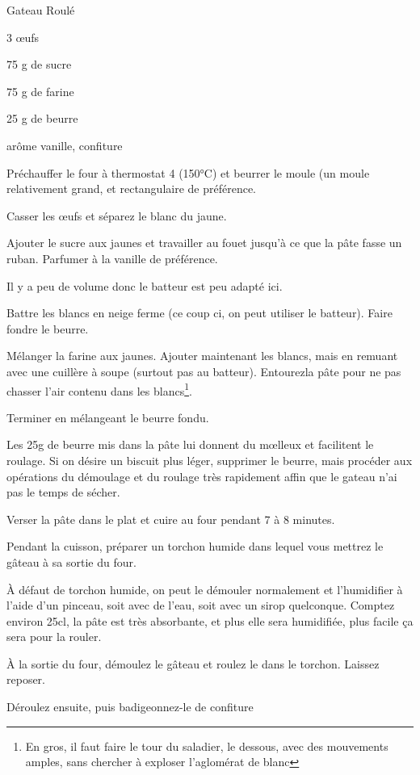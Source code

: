 \begin{recette}{Gateau Roulé}
\begin{ingredients}
\item 3 œufs
\item 75 g de sucre
\item 75 g de farine
\item 25 g de beurre
\item arôme vanille, confiture
\end{ingredients}

\begin{preparation}
\item Préchauffer le four à thermostat 4 (150°C) et beurrer le moule (un moule relativement grand, et rectangulaire de préférence.
\item Casser les œufs et séparez le blanc du jaune.
\item Ajouter le sucre aux jaunes et travailler au fouet jusqu'à ce que la pâte fasse un ruban. Parfumer à la vanille de préférence.
\begin{remarque}
Il y a peu de volume donc le batteur est peu adapté ici.
\end{remarque}
\item Battre les blancs en neige ferme (ce coup ci, on peut utiliser le batteur). Faire fondre le beurre.
\item Mélanger la farine aux jaunes. Ajouter maintenant les blancs, mais en remuant avec une cuillère à soupe (surtout pas au batteur). \og Entourez\fg la pâte pour ne pas chasser l'air contenu dans les blancs\footnote{En gros, il faut faire le tour du saladier, le dessous, avec des mouvements amples, sans chercher à exploser l'aglomérat de blanc}.
\item Terminer en mélangeant le beurre fondu.
\begin{remarque}
Les 25g de beurre mis dans la pâte lui donnent du mœlleux et facilitent le roulage. Si on désire un biscuit plus léger, supprimer le beurre, mais procéder aux opérations du démoulage et du roulage très rapidement affin que le gateau n'ai pas le temps de sécher.
\end{remarque}
\item Verser la pâte dans le plat et cuire au four pendant 7 à 8 minutes.
\item Pendant la cuisson, préparer un torchon humide dans lequel vous mettrez le gâteau à sa sortie du four.
\begin{remarque}
À défaut de torchon humide, on peut le démouler normalement et l'humidifier à l'aide d'un pinceau, soit avec de l'eau, soit avec un sirop quelconque. Comptez environ 25cl, la pâte est très absorbante, et plus elle sera humidifiée, plus facile ça sera pour la rouler.
\end{remarque}
\item À la sortie du four, démoulez le gâteau et roulez le dans le torchon. Laissez reposer.
\item Déroulez ensuite, puis badigeonnez-le de confiture
\end{preparation}


\end{recette}
